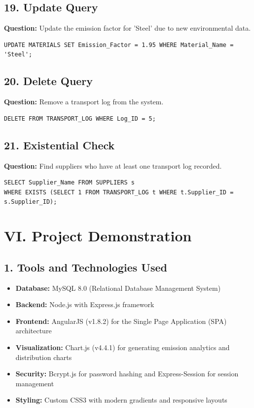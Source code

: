 \documentclass[12pt,a4paper]{article}
\begin{document}
\subsection*{19. Update Query}
\textbf{Question:} Update the emission factor for 'Steel' due to new environmental data.
\begin{lstlisting}
UPDATE MATERIALS SET Emission_Factor = 1.95 WHERE Material_Name = 'Steel';
\end{lstlisting}

\subsection*{20. Delete Query}
\textbf{Question:} Remove a transport log from the system.
\begin{lstlisting}
DELETE FROM TRANSPORT_LOG WHERE Log_ID = 5;
\end{lstlisting}

\subsection*{21. Existential Check}
\textbf{Question:} Find suppliers who have at least one transport log recorded.
\begin{lstlisting}
SELECT Supplier_Name FROM SUPPLIERS s
WHERE EXISTS (SELECT 1 FROM TRANSPORT_LOG t WHERE t.Supplier_ID = s.Supplier_ID);
\end{lstlisting}

\vspace{1cm}
\section*{VI. Project Demonstration}

\subsection*{1. Tools and Technologies Used}
\begin{itemize}
    \item \textbf{Database:} MySQL 8.0 (Relational Database Management System)
    \item \textbf{Backend:} Node.js with Express.js framework
    \item \textbf{Frontend:} AngularJS (v1.8.2) for the Single Page Application (SPA) architecture
    \item \textbf{Visualization:} Chart.js (v4.4.1) for generating emission analytics and distribution charts
    \item \textbf{Security:} Bcrypt.js for password hashing and Express-Session for session management
    \item \textbf{Styling:} Custom CSS3 with modern gradients and responsive layouts
\end{itemize}
\end{document}
